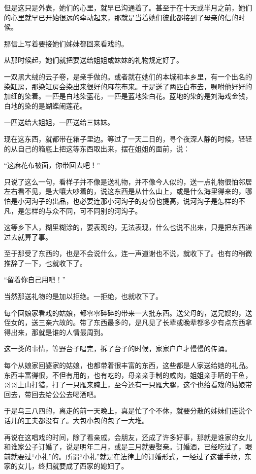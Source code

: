 \par 但是这只是外表，她们的心里，就早已沟通着了。甚至于在十天或半月之前，她们的心里就早已开始很远的牵动起来，那就是当着她们彼此都接到了母亲的信的时候。
\par 那信上写着要接她们姊妹都回来看戏的。
\par 从那时候起，她们就把要送给姐姐或妹妹的礼物规定好了。
\par 一双黑大绒的云子卷，是亲手做的。或者就在她们的本城和本乡里，有一个出名的染缸房，那染缸房会染出来很好的麻花布来。于是送了两匹白布去，嘱咐他好好的加细的染着。一匹是白地染蓝花，一匹是蓝地染白花。蓝地的染的是刘海戏金钱，白地的染的是蝴蝶闹莲花。
\par 一匹送给大姐姐，一匹送给三妹妹。
\par 现在这东西，就都带在箱子里边。等过了一天二日的，寻个夜深人静的时候，轻轻的从自己的箱底上把这等东西取出来，摆在姐姐的面前，说：
\par “这麻花布被面，你带回去吧！”
\par 只说了这么一句，看样子并不像是送礼物，并不像今人似的，送一点礼物很怕邻居左右看不见，是大嚷大吵着的，说这东西是从什么山上，或是什么海里得来的，哪怕是小河沟子的出品，也必要连那小河沟子的身份也提高，说河沟子是怎样的不凡，是怎样的与众不同，可不同别的河沟子。
\par 这等乡下人，糊里糊涂的，要表现的，无法表现，什么也说不出来，只是把东西递过去就算了事。
\par 至于那受了东西的，也是不会说什么，连一声道谢也不说，就收下了。也有的稍微推辞了一下，也就收下了。
\par “留着你自己用吧！”
\par 当然那送礼物的是加以拒绝。一拒绝，也就收下了。
\par 每个回娘家看戏的姑娘，都零零碎碎的带来一大批东西。送父母的，送兄嫂的，送侄女的，送三亲六故的。带了东西最多的，是凡见了长辈或晚辈都多少有点东西拿得出来，那就是谁的人情最周到。
\par 这一类的事情，等野台子唱完，拆了台子的时候，家家户户才慢慢的传诵。
\par 每个从娘家回婆家的姑娘，也都带着很丰富的东西，这些都是人家送给她的礼品。东西丰富得很，不但有用的，也有吃的，母亲亲手制的咸肉，姐姐亲手晒的干鱼，哥哥上山打猎，打了一只雁来腌上，至今还有一只雁大腿，这个也给看戏的姑娘带回去，带回去给公公去喝酒吧。
\par 于是乌三八四的，离走的前一天晚上，真是忙了个不休，就要分散的姊妹们连说个话儿的工夫都没有了。大包小包的包了一大堆。
\par 再说在这唱戏的时间，除了看亲戚，会朋友，还成了许多好事，那就是谁家的女儿和谁家公子订婚了，说是明年二月，或是三月就要娶亲。订婚酒，已经吃过了，眼前就要过“小礼”的。所谓“小礼”就是在法律上的订婚形式，一经过了这番手续，东家的女儿，终归就要成了西家的媳妇了。
